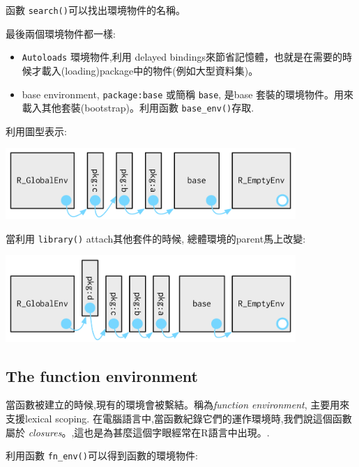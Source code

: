 \documentclass[]{book}
\theoremstyle{definition}
\theoremstyle{definition}
\theoremstyle{definition}
\theoremstyle{remark}
\begin{document}
函數 \texttt{search()}可以找出環境物件的名稱。

最後兩個環境物件都一樣:

\begin{itemize}
\item
  \texttt{Autoloads} 環境物件,利用 delayed
  bindings來節省記憶體，也就是在需要的時候才載入(loading)package中的物件(例如大型資料集)。
\item
  base environment, \texttt{package:base} 或簡稱 \texttt{base}, 是base
  套裝的環境物件。用來 載入其他套裝(bootstrap)。利用函數
  \texttt{base\_env()}存取.
\end{itemize}

利用圖型表示:

\begin{center}\includegraphics[width=4.33in]{diagrams/environments/search-path} \end{center}

當利用 \texttt{library()} attach其他套件的時候,
總體環境的parent馬上改變:

\begin{center}\includegraphics[width=4.33in]{diagrams/environments/search-path-2} \end{center}

\hypertarget{the-function-environment}{%
\subsection{The function environment}\label{the-function-environment}}

當函數被建立的時候,現有的環境會被繫結。稱為\emph{function environment},
主要用來支援lexical scoping.
在電腦語言中,當函數紀錄它們的運作環境時,我們說這個函數屬於
\emph{closures}。,這也是為甚麼這個字眼經常在R語言中出現。.

利用函數 \texttt{fn\_env()}可以得到函數的環境物件:
\end{document}
